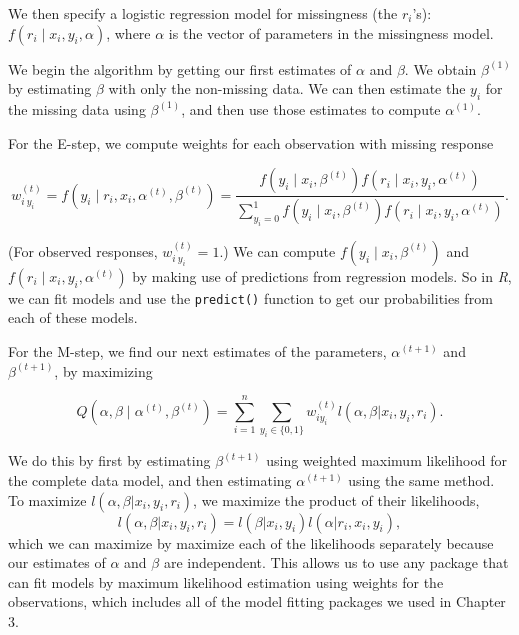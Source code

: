 \documentclass[12pt,twoside]{reedthesis}
\begin{document}
  We then specify a logistic regression model for missingness (the
  \(r_i\)'s): \(f(r_i \;|\; x_i, y_i, \alpha)\), where \(\alpha\) is the
  vector of parameters in the missingness model.
  
  We begin the algorithm by getting our first estimates of \(\alpha\) and
  \(\beta\). We obtain \(\beta^{(1)}\) by estimating \(\beta\) with only
  the non-missing data. We can then estimate the \(y_i\) for the missing
  data using \(\beta^{(1)}\), and then use those estimates to compute
  \(\alpha^{(1)}\).
  
  For the E-step, we compute weights for each observation with missing
  response
  
  \begin{equation}
  w_{i\: y_i}^{(t)} = 
  f(y_i \;|\; r_i, x_i, \alpha^{(t)}, \beta^{(t)}) =
  \frac{f(y_i \;|\; x_i, \beta^{(t)}) f(r_i \;|\; x_i, y_i, \alpha^{(t)})}{
  \sum_{y_i = 0}^1
  f(y_i \;|\; x_i, \beta^{(t)}) f(r_i \;|\; x_i, y_i, \alpha^{(t)})
  }.
  \end{equation}
  
  (For observed responses, \(w_{i\: y_i}^{(t)} = 1\).) We can compute
  \(f(y_i \;|\; x_i, \beta^{(t)})\) and
  \(f(r_i \;|\; x_i, y_i, \alpha^{(t)})\) by making use of predictions
  from regression models. So in \textit{R}, we can fit models and use the
  \texttt{predict()} function to get our probabilities from each of these
  models.
  
  For the M-step, we find our next estimates of the parameters,
  \(\alpha^{(t + 1)}\) and \(\beta^{(t + 1)}\), by maximizing
  
  \begin{equation}
  Q(\alpha, \beta \;|\; \alpha^{(t)}, \beta^{(t)}) =
  \sum_{i = 1}^n \sum_{y_i \in \{0,1\}} w_{iy_i}^{(t)} 
  l(\alpha, \beta | x_i, y_i, r_i).
  \end{equation}
  
  We do this by first by estimating \(\beta^{(t + 1)}\) using weighted
  maximum likelihood for the complete data model, and then estimating
  \(\alpha^{(t + 1)}\) using the same method. To maximize
  \(l(\alpha, \beta | x_i, y_i, r_i)\), we maximize the product of their
  likelihoods,
  \[l(\alpha, \beta | x_i, y_i, r_i) = l(\beta | x_i, y_i) l(\alpha | r_i, x_i, y_i),\]
  which we can maximize by maximize each of the likelihoods separately
  because our estimates of \(\alpha\) and \(\beta\) are independent. This
  allows us to use any package that can fit models by maximum likelihood
  estimation using weights for the observations, which includes all of the
  model fitting packages we used in Chapter 3.
  
\end{document}
